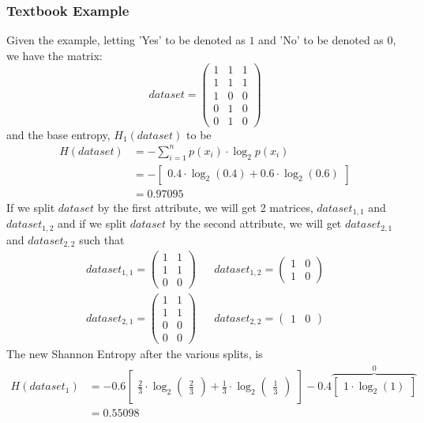 \documentclass[11pt]{article}
\begin{document}
\subsubsection*{Textbook Example}
Given the example, letting 'Yes' to be denoted as $1$ and 'No' to be denoted as $0$, we have the matrix:
\begin{equation*}
dataset = \begin{pmatrix}
1&1&1\\1&1&1\\1&0&0\\0&1&0\\0&1&0
\end{pmatrix}
\end{equation*}
and the base entropy, $H_1(dataset)$ to be
\begin{align*}
H(dataset) &= -\sum_{i=1}^n p(x_i)\cdot \log_2p(x_i)\\&= -\begin{bmatrix}
0.4\cdot\log_2(0.4) + 0.6\cdot\log_2(0.6)\end{bmatrix}\\
&= 0.97095
\end{align*}
If we split $dataset$ by the first attribute, we will get 2 matrices, $dataset_{1,1}$ and $dataset_{1,2}$ and if we split $dataset$ by the second attribute, we will get $dataset_{2,1}$ and  $dataset_{2,2}$ such that
\begin{align*}
dataset_{1,1} = \begin{pmatrix}
1&1\\1&1\\0&0
\end{pmatrix}&&
dataset_{1,2} =\begin{pmatrix}
1&0\\1&0
\end{pmatrix} \\
dataset_{2,1} =\begin{pmatrix}
1&1\\1&1\\0&0\\0&0
\end{pmatrix} &&
dataset_{2,2} = \begin{pmatrix}
1&0
\end{pmatrix}
\end{align*}
The new Shannon Entropy after the various splits, is
\begin{align*}
H(dataset_1) &=
-0.6 \begin{bmatrix}
\frac 2 3 \cdot \log_2 \begin{pmatrix}\frac 23\end{pmatrix} + \frac 13 \cdot \log_2 \begin{pmatrix}\frac 13\end{pmatrix}
\end{bmatrix} -0.4\overbrace{\begin{bmatrix}
	1 \cdot \log_2 (1)
	\end{bmatrix}}^0  \\&=0.55098
\end{align*}
\end{document}
